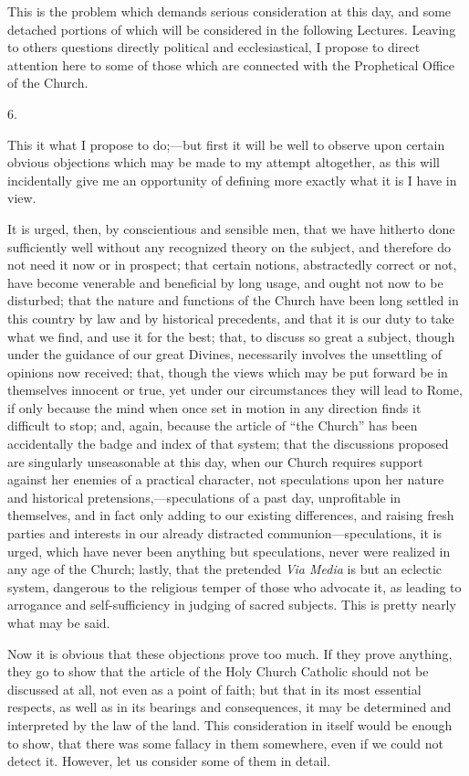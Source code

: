 This is the problem which demands serious consideration at this
day, and some detached portions of which will be considered in the
following Lectures. Leaving to others questions directly political and
ecclesiastical, I propose to direct attention here to some of those
which are connected with the Prophetical Office of the Church.

6.

This it what I propose to do;—but first it will be well to
observe upon certain obvious objections which may be made to my
attempt altogether, as this will incidentally give me an opportunity
of defining more exactly what it is I have in view.

It is urged, then, by conscientious and sensible men, that we have
hitherto done sufficiently well without any recognized theory on the
subject, and therefore do not need it now or in prospect; that certain
notions, abstractedly correct or not, have become venerable and
beneficial by long usage, and ought not now to be disturbed; that
the nature and functions of the Church have been long settled in this
country by law and by historical precedents, and that it is our duty
to take what we find, and use it for the best; that, to discuss so
great a subject, though under the guidance of our great Divines,
necessarily involves the unsettling of opinions now received; that,
though the views which may be put forward be in themselves innocent or
true, yet under our circumstances they will lead to Rome, if only
because the mind when once set in motion in any direction finds it
difficult to stop; and, again, because the article of ``the
Church'' has been accidentally the badge and index of that system;
that the discussions proposed are singularly unseasonable at this day,
when our Church requires support against her enemies of a practical
character, not speculations upon her nature and historical
pretensions,—speculations of a past day, unprofitable in themselves,
and in fact only adding to our existing differences, and raising fresh
parties and interests in our already distracted communion—speculations,
it is urged, which have never been anything but speculations, never
were realized in any age of the Church; lastly, that the pretended \emph{Via
Media} is but an eclectic system, dangerous to the religious temper
of those who advocate it, as leading to arrogance and self-sufficiency
in judging of sacred subjects. This is pretty nearly what may be said.

Now it is obvious that these objections prove too much. If they
prove anything, they go to show that the article of the Holy Church
Catholic should not be discussed at all, not even as a point of faith;
but that in its most essential respects, as well as in its bearings
and consequences, it may be determined and interpreted by the law of
the land. This consideration in itself would be enough to show, that
there was some fallacy in them somewhere, even if we could not detect
it. However, let us consider some of them in detail.

